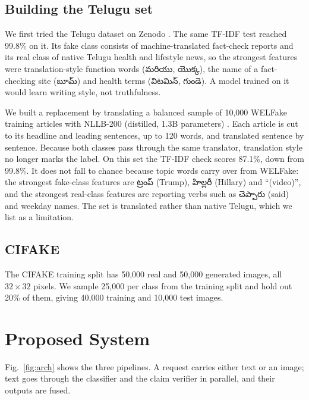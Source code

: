 \documentclass[conference]{IEEEtran}
\begin{document}
\subsection{Building the Telugu set}
We first tried the Telugu dataset on Zenodo \cite{telugu2024zenodo}. The same TF-IDF test reached 99.8\% on it. Its fake class consists of machine-translated fact-check reports and its real class of native Telugu health and lifestyle news, so the strongest features were translation-style function words ({\telugufont మరియు}, {\telugufont యొక్క}), the name of a fact-checking site ({\telugufont బూమ్}) and health terms ({\telugufont విటమిన్}, {\telugufont గుండె}). A model trained on it would learn writing style, not truthfulness.

We built a replacement by translating a balanced sample of 10,000 WELFake training articles with NLLB-200 (distilled, 1.3B parameters) \cite{nllb2022}. Each article is cut to its headline and leading sentences, up to 120 words, and translated sentence by sentence. Because both classes pass through the same translator, translation style no longer marks the label. On this set the TF-IDF check scores 87.1\%, down from 99.8\%. It does not fall to chance because topic words carry over from WELFake: the strongest fake-class features are {\telugufont ట్రంప్} (Trump), {\telugufont హిల్లరీ} (Hillary) and ``(video)'', and the strongest real-class features are reporting verbs such as {\telugufont చెప్పారు} (said) and weekday names. The set is translated rather than native Telugu, which we list as a limitation.

\subsection{CIFAKE}
The CIFAKE training split has 50,000 real and 50,000 generated images, all $32\times32$ pixels. We sample 25,000 per class from the training split and hold out 20\% of them, giving 40,000 training and 10,000 test images.

\section{Proposed System}

Fig.~\ref{fig:arch} shows the three pipelines. A request carries either text or an image; text goes through the classifier and the claim verifier in parallel, and their outputs are fused.
\end{document}
